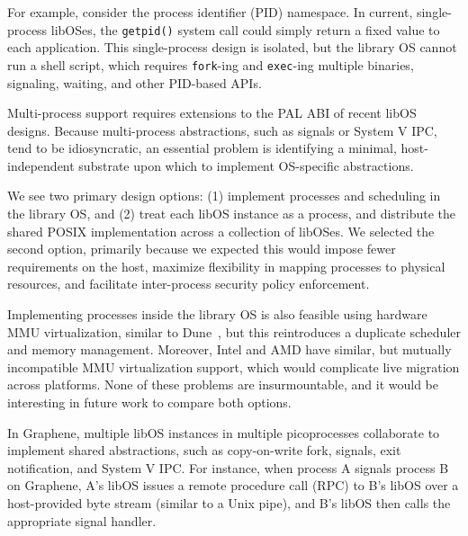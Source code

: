 
For example,
consider the process identifier (PID) namespace.
In current, single-process lib\-OSes, 
the {\tt getpid()} system call could simply return a fixed value to each application.
This  single-process design is isolated,
but the library OS cannot run a shell script, which requires {\tt fork}-ing and {\tt exec}-ing multiple binaries, signaling, waiting, and other
PID-based APIs.

\vspace{5pt}
Multi-process  support requires extensions to the PAL ABI of recent libOS designs.
Because multi-process abstractions, 
such as signals or System V IPC, 
tend to be idiosyncratic,
an essential problem is identifying a minimal, host-independent
substrate upon which 
to implement OS-specific abstractions.

We see two primary design options:
(1) implement processes and scheduling in 
the library OS, and (2) treat each libOS instance as a process, and distribute the 
shared POSIX implementation across a collection of libOSes.
We selected the second option, primarily because we expected this would impose fewer
requirements on the host, maximize flexibility in mapping processes 
to physical resources, and facilitate inter-process security policy enforcement. %

Implementing processes
inside the library OS is also feasible using 
hardware MMU virtualization, similar to Dune~\cite{belay12dune},
but this reintroduces a duplicate scheduler and memory management.
Moreover, Intel and AMD have similar, but mutually incompatible MMU virtualization support,
which would complicate live migration across platforms.
None of these problems are insurmountable, and it would be interesting in future
work to compare both options.

\vspace{5pt}
In Graphene, multiple libOS instances in multiple picoprocesses collaborate to 
implement shared abstractions, such as 
 copy-on-write fork, signals, exit notification,
and System V IPC.
For instance, when process A signals process B on Graphene, A's libOS issues
a remote procedure call (RPC) to B's libOS over a host-provided byte stream (similar to a Unix pipe),
and B's libOS then calls the appropriate signal handler.

